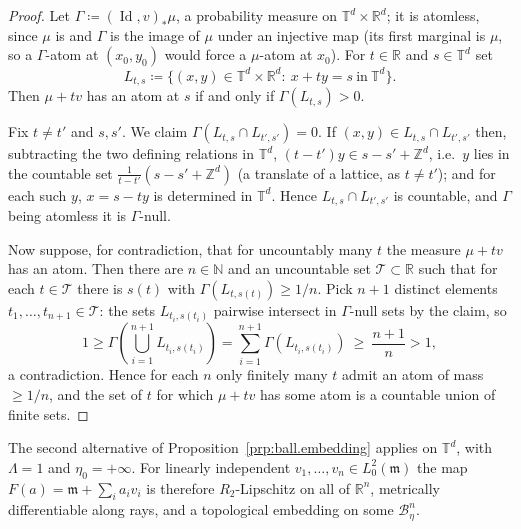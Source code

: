 \documentclass[11pt,reqno]{amsart}
\theoremstyle{plain}
\theoremstyle{definition}
\newcommand{\T}{\mathbb{T}}
\newcommand{\Z}{\mathbb{Z}}
\newcommand{\R}{\mathbb{R}}
\newcommand{\N}{\mathbb{N}}
\newcommand{\Leb}{\mathfrak{m}}
\DeclareMathOperator{\Id}{Id}
\begin{document}
\begin{proof}
    Let \( \Gamma\coloneqq (\Id,v)_\ast \mu \), a probability measure on \( \T^d\times\R^d \); it is atomless, since \( \mu \) is and \( \Gamma \) is the image of \( \mu \) under an injective map (its first marginal is \( \mu \), so a \( \Gamma \)-atom at \( (x_0,y_0) \) would force a \( \mu \)-atom at \( x_0 \)).
    For \( t\in\R \) and \( s\in\T^d \) set
    \[
        L_{t,s}\coloneqq \big\{(x,y)\in\T^d\times\R^d:\ x+ty=s\ \text{in}\ \T^d\big\}.
    \]
    Then \( \mu+tv \) has an atom at \( s \) if and only if \( \Gamma(L_{t,s})>0 \).

    Fix \( t\neq t' \) and \( s,s' \).
    We claim \( \Gamma(L_{t,s}\cap L_{t',s'})=0 \).
    If \( (x,y)\in L_{t,s}\cap L_{t',s'} \) then, subtracting the two defining relations in \( \T^d \), \( (t-t')y\in s-s'+\Z^d \), i.e.\ \( y \) lies in the countable set \( \frac{1}{t-t'}\left(s-s'+\Z^d\right) \) (a translate of a lattice, as \( t\ne t' \)); and for each such \( y \), \( x=s-ty \) is determined in \( \T^d \).
    Hence \( L_{t,s}\cap L_{t',s'} \) is countable, and \( \Gamma \) being atomless it is \( \Gamma \)-null.

    Now suppose, for contradiction, that for uncountably many \( t \) the measure \( \mu+tv \) has an atom.
    Then there are \( n\in\N \) and an uncountable set \( \mathcal T\subset\R \) such that for each \( t\in\mathcal T \) there is \( s(t) \) with \( \Gamma(L_{t,s(t)})\ge1/n \).
    Pick \( n+1 \) distinct elements \( t_1,\dots,t_{n+1}\in\mathcal T \): the sets \( L_{t_i,s(t_i)} \) pairwise intersect in \( \Gamma \)-null sets by the claim, so
    \[
        1\ge\Gamma\left(\bigcup_{i=1}^{n+1}L_{t_i,s(t_i)}\right)=\sum_{i=1}^{n+1}\Gamma\left(L_{t_i,s(t_i)}\right)\ \ge\ \frac{n+1}{n}>1,
    \]
    a contradiction.
    Hence for each \( n \) only finitely many \( t \) admit an atom of mass \( \ge1/n \), and the set of \( t \) for which \( \mu+tv \) has some atom is a countable union of finite sets.
\end{proof}

The second alternative of Proposition~\ref{prp:ball.embedding} applies on \( \T^d \), with \( \Lambda=1 \) and \( \eta_0=+\infty \).
For linearly independent \( v_1,\dots,v_n\in L^2_0(\Leb) \) the map \( F(a)=\Leb+\sum_ia_iv_i \) is therefore \( R_2 \)-Lipschitz on all of \( \R^n \), metrically differentiable along rays, and a topological embedding on some \( \mathcal B^n_\eta \).
\end{document}
